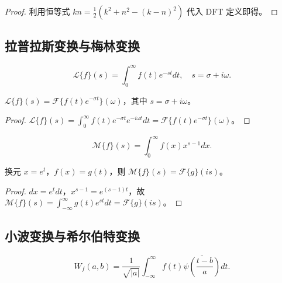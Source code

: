 \begin{proof}
利用恒等式 $kn = \frac{1}{2}(k^2 + n^2 - (k-n)^2)$ 代入 DFT 定义即得。
\end{proof}

\subsection{\texorpdfstring{拉普拉斯变换与梅林变换}{拉普拉斯变换与梅林变换}}

\begin{definition}[拉普拉斯变换]\label{def:laplace}
\[\mathcal{L}\{f\}(s) = \int_0^\infty f(t) e^{-st} dt, \quad s = \sigma + i\omega.\]
\end{definition}

\begin{proposition}[拉普拉斯变换与傅里叶变换的关系]\label{prop:laplace_fourier}
$\mathcal{L}\{f\}(s) = \mathcal{F}\{f(t) e^{-\sigma t}\}(\omega)$，其中 $s = \sigma + i\omega$。
\end{proposition}

\begin{proof}
$\mathcal{L}\{f\}(s) = \int_0^\infty f(t)e^{-\sigma t}e^{-i\omega t}dt = \mathcal{F}\{f(t)e^{-\sigma t}\}(\omega)$。
\end{proof}

\begin{definition}[梅林变换]\label{def:mellin}
\[\mathcal{M}\{f\}(s) = \int_0^\infty f(x) x^{s-1} dx.\]
\end{definition}

\begin{proposition}[梅林变换与傅里叶变换的关系]\label{prop:mellin_fourier}
换元 $x = e^t$，$f(x) = g(t)$，则 $\mathcal{M}\{f\}(s) = \mathcal{F}\{g\}(is)$。
\end{proposition}

\begin{proof}
$dx = e^t dt$，$x^{s-1} = e^{(s-1)t}$，故 $\mathcal{M}\{f\}(s) = \int_{-\infty}^{\infty} g(t)e^{st}dt = \mathcal{F}\{g\}(is)$。
\end{proof}

\subsection{\texorpdfstring{小波变换与希尔伯特变换}{小波变换与希尔伯特变换}}

\begin{definition}[小波变换]\label{def:wavelet_transform}
\[W_f(a,b) = \frac{1}{\sqrt{|a|}} \int_{-\infty}^{\infty} f(t) \overline{\psi\left(\frac{t-b}{a}\right)} dt.\]
\end{definition}

